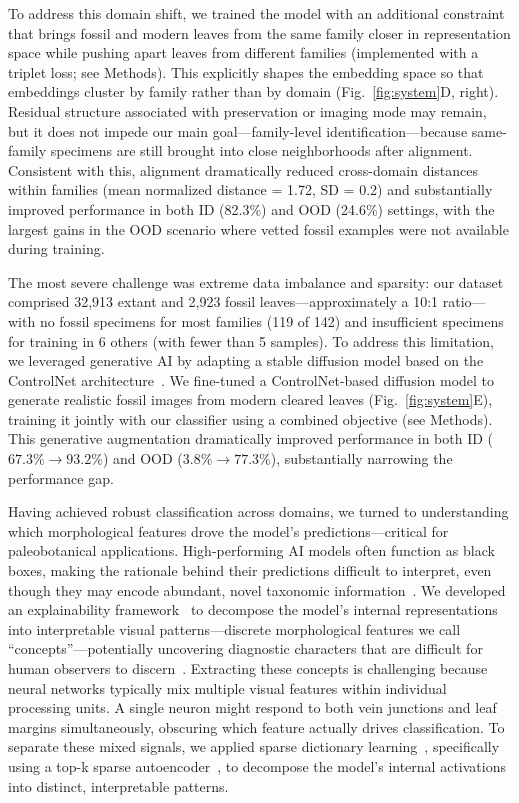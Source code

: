 \documentclass[pdflatex,lineno,sn-nature]{sn-jnl}%
\theoremstyle{plain}%
\theoremstyle{definition}%
\theoremstyle{remark}%
\begin{document}
To address this domain shift, we trained the model with an additional constraint that brings fossil and modern leaves from the same family closer in representation space while pushing apart leaves from different families (implemented with a triplet loss; see Methods). This explicitly shapes the embedding space so that embeddings cluster by family rather than by domain (Fig.~\ref{fig:system}D, right). Residual structure associated with preservation or imaging mode may remain, but it does not impede our main goal---family-level identification---because same-family specimens are still brought into close neighborhoods after alignment. Consistent with this, alignment dramatically reduced cross-domain distances within families (mean normalized distance = 1.72, SD = 0.2) and substantially improved performance in both ID (82.3\%) and OOD (24.6\%) settings, with the largest gains in the OOD scenario where vetted fossil examples were not available during training.


The most severe challenge was extreme data imbalance and sparsity: our dataset comprised 32,913 extant and 2,923 fossil leaves---approximately a 10:1 ratio---with no fossil specimens for most families (119 of 142) and insufficient specimens for training in 6 others (with fewer than 5 samples). To address this limitation, we leveraged generative AI by adapting a stable diffusion model based on the ControlNet architecture~\citep{zhang2023adding}. We fine-tuned a ControlNet-based diffusion model to generate realistic fossil images from modern cleared leaves (Fig.~\ref{fig:system}E), training it jointly with our classifier using a combined objective (see Methods). This generative augmentation dramatically improved performance in both ID ($67.3\% \rightarrow 93.2\%$) and OOD ($3.8\% \rightarrow 77.3\%$), substantially narrowing the performance gap. 

Having achieved robust classification across domains, we turned to understanding which morphological features drove the model's predictions—critical for paleobotanical applications. High-performing AI models often function as black boxes, making the rationale behind their predictions difficult to interpret, even though they may encode abundant, novel taxonomic information~\citep{spagnuolo22, wilf2016leaves}. We developed an explainability framework~\citep{fel2024sparks} to decompose the model's internal representations into interpretable visual patterns—discrete morphological features we call ``concepts''—potentially uncovering diagnostic characters that are difficult for human observers to discern~\citep{spagnuolo22}.
Extracting these concepts is challenging because neural networks typically mix multiple visual features within individual processing units. A single neuron might respond to both vein junctions and leaf margins simultaneously, obscuring which feature actually drives classification. To separate these mixed signals, we applied sparse dictionary learning~\citep{holistic}, specifically using a top-k sparse autoencoder~\citep{gao2024scaling,fel2025archetypal}, to decompose the model's internal activations into distinct, interpretable patterns. 
\end{document}
